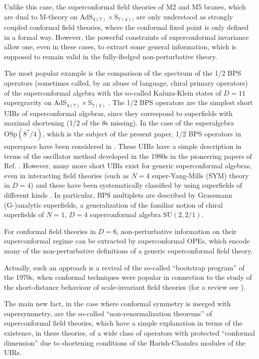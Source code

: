 \documentclass[a4paper,11pt]{article}
\begin{document}
Unlike this case, the superconformal field theories of M2 and M5
branes, which are dual to M-theory on AdS$_{4(7)}
\times$S$_{7(4)}$, are only understood as strongly coupled
conformal field theories, where the conformal fixed point is only
defined in a formal way. However, the powerful constraints of
superconformal invariance allow one, even in these cases, to
extract some general information, which is supposed to remain
valid in the fully-fledged non-perturbative theory.

The most popular example is the comparison \cite{AOY} of the
spectrum of the 1/2 BPS operators (sometimes called, by an abuse
of language, chiral primary operators) of the superconformal
algebra with the so-called Kaluza-Klein states \cite{GvNW} of
$D=11$ supergravity on AdS$_{4(7)} \times$S$_{7(4)}$ \cite{vNAll}.
The 1/2 BPS operators are the simplest short UIRs of
superconformal algebras, since they correspond to superfields with
maximal shortening (1/2 of the $\theta$s missing). In the case of
the superalgebra $\mbox{OSp}(8^{*}/4)$, which is the subject of
the present paper, 1/2 BPS operators in superspace have been
considered in \cite{Hproc,FS2}. These UIRs have a simple
description \cite{GvNW,GT} in terms of the oscillator method
developed in the 1980s in the pioneering papers of Ref.
\cite{GunAll}. However, many more short UIRs exist for generic
superconformal algebras, even in interacting field theories (such
as $N=4$ super-Yang-Mills (SYM) theory in $D=4$) and these have
been systematically classified by using superfields of different
kinds \cite{FS1,HHowe}. In particular, BPS multiplets are
described by Grassmann (G-)analytic superfields, a generalization
of the familiar notion of chiral superfields of $N=1, \, D=4$
superconformal algebra $\mbox{SU}(2,2/1)$.

For conformal field theories in $D=6$, non-perturbative information on
their superconformal regime can be extracted by superconformal OPEs,
which encode many of the non-perturbative definitions of a generic
superconformal field theory.

Actually, such an approach is a revival of the so-called ``bootstrap program''
of the 1970s, when conformal techniques were popular in connection to the study
of the short-distance behaviour of scale-invariant field theories (for a review
see \cite{Pisa}).

The main new fact, in the case where conformal symmetry is merged with
supersymmetry, are the so-called ``non-renormalization theorems'' of
superconformal field theories, which have a simple explanation in terms of the
existence, in these theories, of a wide class of operators with protected
``conformal dimension'' due to shortening conditions \cite{FF,dp,Minw2} of
the Harish-Chandra modules \cite{HCh,FeFo} of the UIRs.
\end{document}
